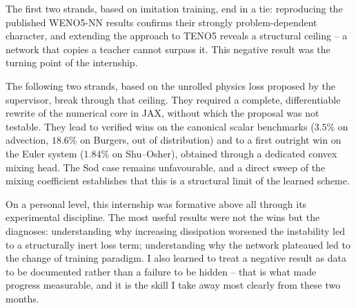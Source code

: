 \documentclass[12pt,a4paper,oneside]{report}
\begin{document}
The first two strands, based on imitation training, end in a tie: reproducing
the published WENO5-NN results confirms their strongly problem-dependent
character, and extending the approach to TENO5 reveals a structural ceiling --
a network that copies a teacher cannot surpass it. This negative result was the
turning point of the internship.

The following two strands, based on the unrolled physics loss proposed by the
supervisor, break through that ceiling. They required a complete,
differentiable rewrite of the numerical core in JAX, without which the proposal
was not testable. They lead to verified wins on the canonical scalar benchmarks
($3.5\%$ on advection, $18.6\%$ on Burgers, out of distribution) and to a first
outright win on the Euler system ($1.84\%$ on Shu--Osher), obtained through a
dedicated convex mixing head. The Sod case remains unfavourable, and a direct
sweep of the mixing coefficient establishes that this is a structural limit of
the learned scheme.

On a personal level, this internship was formative above all through its
experimental discipline. The most useful results were not the wins but the
diagnoses: understanding why increasing dissipation worsened the instability
led to a structurally inert loss term; understanding why the network plateaued
led to the change of training paradigm. I also learned to treat a negative
result as data to be documented rather than a failure to be hidden -- that is
what made progress measurable, and it is the skill I take away most clearly
from these two months.
\end{document}

